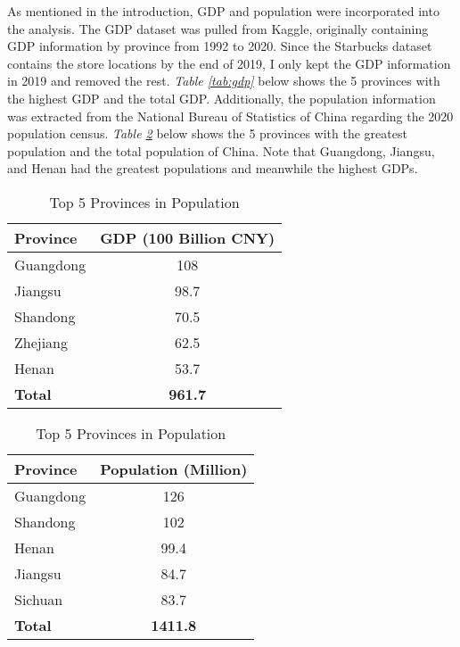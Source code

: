 \documentclass{article}
\begin{document}
As mentioned in the introduction, GDP and population were incorporated into the analysis. The GDP dataset was pulled from Kaggle, originally containing GDP information by province from 1992 to 2020. Since the Starbucks dataset contains the store locations by the end of 2019, I only kept the GDP information in 2019 and removed the rest. \textit{Table \ref{tab:gdp}} below shows the 5 provinces with the highest GDP and the total GDP. Additionally, the population information was extracted from the National Bureau of Statistics of China regarding the 2020 population census. \textit{Table \ref{tab:population}} below shows the 5 provinces with the greatest population and the total population of China. Note that Guangdong, Jiangsu, and Henan had the greatest populations and meanwhile the highest GDPs.

\begin{table}[htbp]
    \centering
    \begin{minipage}{0.48\linewidth}
        \centering
        \begin{tabular}{l c}
            \toprule
            \textbf{Province} & \textbf{GDP (100 Billion CNY)} \\
            \midrule
            Guangdong & 108 \\
            Jiangsu & 98.7 \\
            Shandong & 70.5 \\
            Zhejiang & 62.5 \\
            Henan & 53.7 \\
            \textbf{Total} & \textbf{961.7} \\
            \bottomrule
        \end{tabular}
        \caption{Top 5 Provinces in GDP}
        \label{tab:gdp}
    \end{minipage}
    \quad
    \begin{minipage}{0.48\linewidth}
        \centering
        \begin{tabular}{l c}
            \toprule
            \textbf{Province} & \textbf{Population (Million)} \\
            \midrule
            Guangdong & 126 \\
            Shandong & 102 \\
            Henan & 99.4 \\
            Jiangsu & 84.7 \\
            Sichuan & 83.7 \\
            \textbf{Total} & \textbf{1411.8} \\
            \bottomrule
        \end{tabular}
        \caption{Top 5 Provinces in Population}
        \label{tab:population}
    \end{minipage}
\end{table}
\end{document}
